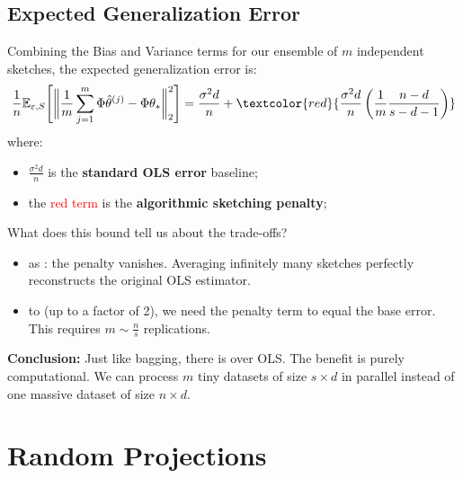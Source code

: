 \documentclass[
11pt,notheorems,hyperref={pdfauthor=whatever}
]{beamer}
\begin{document}
\subsection{Expected Generalization Error}
\begin{frame}
    Combining the Bias and Variance terms for our ensemble of \(m\) independent sketches, the expected generalization error is:
    \[
        \frac{1}{n} \mathbb{E}_{\varepsilon, S} \Bigg[ \bigg\| \frac{1}{m} \sum_{j=1}^m \Phi\hat{\theta}^{(j)} - \Phi\theta_* \bigg\|_2^2 \Bigg] = \frac{\sigma^2 d}{n} + \textcolor{red}{\frac{\sigma^2 d}{n}\left(\frac{1}{m}\frac{n-d}{s-d-1}\right)}
    \]
    where:
    \begin{itemize}
        \item \(\frac{\sigma^2 d}{n}\) is the \alert{\textbf{standard OLS error}} baseline;
        \item the \textcolor{red}{red term} is the \alert{\textbf{algorithmic sketching penalty}};
    \end{itemize}

    What does this bound tell us about the trade-offs?
    \begin{itemize}
        \item as : the penalty vanishes. Averaging infinitely many sketches perfectly reconstructs the original OLS estimator.
        \item to  (up to a factor of 2), we need the penalty term to equal the base error. This requires \(m \sim \frac{n}{s}\) replications.
    \end{itemize}
    \vspace{0.25cm}
    \textbf{Conclusion:} Just like bagging, there is  over OLS. The benefit is purely computational. We can process \(m\) tiny datasets of size \(s \times d\) in parallel instead of one massive dataset of size \(n \times d\).

\end{frame}

\section{Random Projections}
\end{document}
